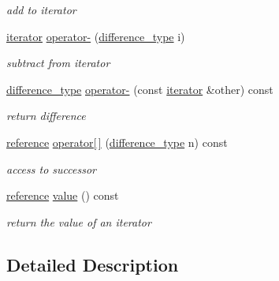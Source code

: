 \begin{DoxyCompactItemize}
\begin{DoxyCompactList}\small\item\em add to iterator \end{DoxyCompactList}\item 
\hyperlink{classnlohmann_1_1basic__json_1_1iterator}{iterator} \hyperlink{classnlohmann_1_1basic__json_1_1iterator_a790f550ff168095c83c2e459c575916c}{operator-\/} (\hyperlink{classnlohmann_1_1basic__json_1_1const__iterator_a49d7c3e9ef3280df03052cce988b792f}{difference\-\_\-type} i)
\begin{DoxyCompactList}\small\item\em subtract from iterator \end{DoxyCompactList}\item 
\hyperlink{classnlohmann_1_1basic__json_1_1const__iterator_a49d7c3e9ef3280df03052cce988b792f}{difference\-\_\-type} \hyperlink{classnlohmann_1_1basic__json_1_1iterator_a9f3940ac5fb2c6ff8045ed59b8a0866f}{operator-\/} (const \hyperlink{classnlohmann_1_1basic__json_1_1iterator}{iterator} \&other) const 
\begin{DoxyCompactList}\small\item\em return difference \end{DoxyCompactList}\item 
\hyperlink{classnlohmann_1_1basic__json_1_1const__iterator_aefd248cac6493eed1e6ff53ba6a63eb2}{reference} \hyperlink{classnlohmann_1_1basic__json_1_1iterator_a7e01532727c10f87926dac4eb8e170f4}{operator\mbox{[}$\,$\mbox{]}} (\hyperlink{classnlohmann_1_1basic__json_1_1const__iterator_a49d7c3e9ef3280df03052cce988b792f}{difference\-\_\-type} n) const 
\begin{DoxyCompactList}\small\item\em access to successor \end{DoxyCompactList}\item 
\hyperlink{classnlohmann_1_1basic__json_1_1const__iterator_aefd248cac6493eed1e6ff53ba6a63eb2}{reference} \hyperlink{classnlohmann_1_1basic__json_1_1iterator_a8ffbf287736048e683f58306fdb8701f}{value} () const 
\begin{DoxyCompactList}\small\item\em return the value of an iterator \end{DoxyCompactList}\end{DoxyCompactItemize}


\subsection{Detailed Description}
